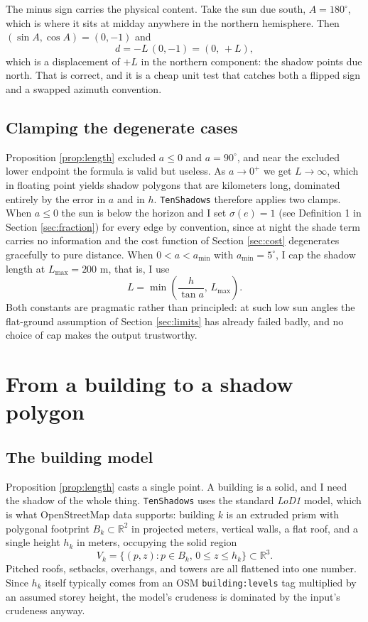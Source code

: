 \documentclass[11pt,a4paper]{article}
\theoremstyle{plain}
\theoremstyle{definition}
\theoremstyle{remark}
\begin{document}
The minus sign carries the physical content. Take the sun due south, $A = 180^\circ$, which is where it sits at midday anywhere in the northern hemisphere. Then $(\sin A, \cos A) = (0, -1)$ and
$$d = -L\,(0,-1) = (0, \,  +L),$$
which is a displacement of $+L$ in the northern component: the shadow points due north. That is correct, and it is a cheap unit test that catches both a flipped sign and a swapped azimuth convention.

\subsection{Clamping the degenerate cases}

Proposition \ref{prop:length} excluded $a \le 0$ and $a = 90^\circ$, and near the excluded lower endpoint the formula is valid but useless. As $a \to 0^+$ we get $L \to \infty$, which in floating point yields shadow polygons that are kilometers long, dominated entirely by the error in $a$ and in $h$. \texttt{TenShadows} therefore applies two clamps. When $a \le 0$ the sun is below the horizon and I set $\sigma(e) = 1$ (see Definition 1 in Section \ref{sec:fraction}) for every edge by convention, since at night the shade term carries no information and the cost function of Section \ref{sec:cost} degenerates gracefully to pure distance. When $0 < a < a_{\min}$ with $a_{\min} = 5^\circ$, I cap the shadow length at $L_{\max} = 200$ m, that is, I use
$$L = \min \left(\frac{h}{\tan a}, \,  L_{\max}\right).$$
Both constants are pragmatic rather than principled: at such low sun angles the flat-ground assumption of Section \ref{sec:limits} has already failed badly, and no choice of cap makes the output trustworthy.

\section{From a building to a shadow polygon}
\label{sec:polygon}

\subsection{The building model}

Proposition \ref{prop:length} casts a single point. A building is a solid, and I need the shadow of the whole thing. \texttt{TenShadows} uses the standard \emph{LoD1} model, which is what OpenStreetMap data supports: building $k$ is an extruded prism with polygonal footprint $B_k \subset \mathbb{R}^2$ in projected meters, vertical walls, a flat roof, and a single height $h_k$ in meters, occupying the solid region
$$V_k = \{(p, z) : p \in B_k, \,  0 \le z \le h_k\} \subset \mathbb{R}^3.$$
Pitched roofs, setbacks, overhangs, and towers are all flattened into one number. Since $h_k$ itself typically comes from an OSM \texttt{building:levels} tag multiplied by an assumed storey height, the model's crudeness is dominated by the input's crudeness anyway.
\end{document}
